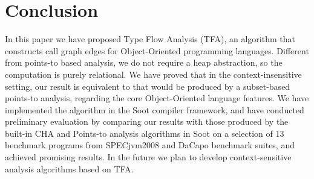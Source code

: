 \documentclass{llncs}
\begin{document}
\section{Conclusion}\label{sec:conclusion}

In this paper we have proposed Type Flow Analysis (TFA), an algorithm that constructs call graph edges for Object-Oriented programming languages. Different from points-to based analysis, we do not require a heap abstraction, so the computation is purely relational. We have proved that in the context-insensitive setting, our result is equivalent to that would be produced by a subset-based points-to analysis, regarding the core Object-Oriented language features. We have implemented the algorithm in the Soot compiler framework, and have conducted preliminary evaluation by comparing our results with those produced by the built-in CHA and Points-to analysis algorithms in Soot on a selection of $13$ benchmark programs from SPECjvm2008 and DaCapo benchmark suites, and achieved promising results. In the future we plan to develop context-sensitive analysis algorithms based on TFA.



\end{document}
